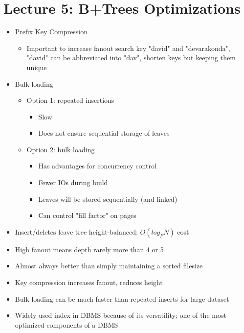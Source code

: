 \documentclass{article}
\begin{document}
\section{Lecture 5: B+Trees Optimizations}
\begin{itemize}
    \item Prefix Key Compression
    \begin{itemize}
        \item Important to increase fanout
            \subitem search key "david" and "devarakonda", "david" can be abbreviated into "dav", shorten keys but keeping them unique
    \end{itemize}
    \item Bulk loading
        \begin{itemize}
            \item Option 1: repeated insertions
            \begin{itemize}
                \item Slow
                \item Does not ensure sequential storage of leaves
            \end{itemize}
            \item Option 2: bulk loading
            \begin{itemize}
                \item Has advantages for concurrency control
                \item Fewer IOs during build
                \item Leaves will be stored sequentially (and linked)
                \item Can control "fill factor" on pages
            \end{itemize}
        \end{itemize}
        \item Insert/deletes leave tree height-balanced: $O(log_F N)$ cost
        \item High fanout means depth rarely more than 4 or 5
        \item Almost always better than simply maintaining a sorted filesize
        \item Key compression increases fanout, reduces height
        \item Bulk loading can be much faster than repeated inserts for large dataset
        \item Widely used index in DBMS because of its versatility; one of the most optimized components of a DBMS
\end{itemize}
\end{document}
